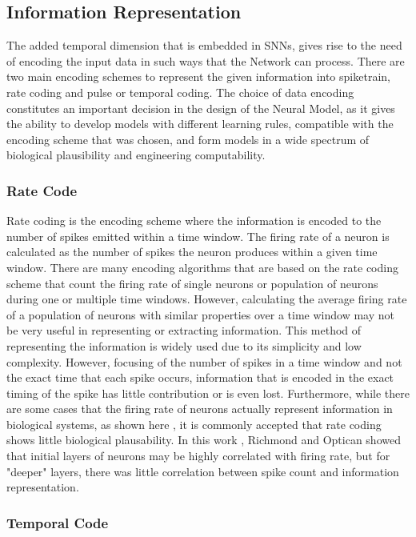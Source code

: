\documentclass[12pt]{report}
\begin{document}
\subsection{Information Representation}

The added temporal dimension that is embedded in SNNs, gives rise to the need of encoding the input data in such ways that the Network can process. There are two main encoding schemes to represent the given information into spiketrain, rate coding and pulse or temporal coding. The choice of data encoding constitutes an important decision in the design of the Neural Model, as it gives the ability to develop models with different learning rules, compatible with the encoding scheme that was chosen, and form models in a wide spectrum of biological plausibility and engineering computability.

\subsubsection{Rate Code}

Rate coding is the encoding scheme where the information is encoded to the number of spikes emitted within a time window. The firing rate of a neuron is calculated as the number of spikes the neuron produces within a given time window. There are many encoding algorithms that are based on the rate coding scheme that count the firing rate of single neurons or population of neurons during one or multiple time windows. However, calculating the average firing rate of a population of neurons with similar properties over a time window may not be very useful in representing or extracting information. This method of representing the information is widely used due to its simplicity and low complexity. However, focusing of the number of spikes in a time window and not the exact time that each spike occurs, information that is encoded in the exact timing of the spike has little contribution or is even lost. Furthermore, while there are some cases that the firing rate of neurons actually represent information in biological systems, as shown here \cite{Huxter2003}, it is commonly accepted that rate coding shows little biological plausability. In this work \cite{Richmond1987}, Richmond and Optican showed that initial layers of neurons may be highly correlated with firing rate, but for "deeper" layers, there was little correlation between spike count and information representation. 

\subsubsection{Temporal Code}
\end{document}
